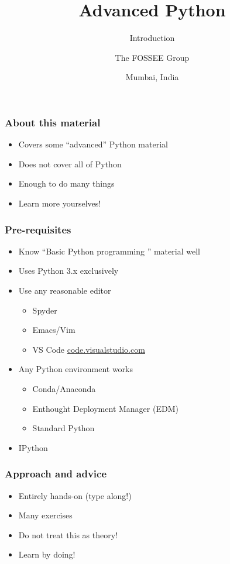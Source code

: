 \documentclass[14pt,compress,aspectratio=169]{beamer}
\title[Introduction]{Advanced Python}
\subtitle{Introduction}
\author[FOSSEE] {The FOSSEE Group}
\institute[IIT Bombay] {Department of Aerospace Engineering\\IIT Bombay}
\date[] {Mumbai, India}
\begin{document}
\begin{frame}
  \titlepage
\end{frame}

\begin{frame}
  \frametitle{About this material}
  \begin{itemize}
  \item Covers some ``advanced'' Python material
  \item Does not cover all of Python
  \item Enough to do many things
    \vspace*{0.5in}
  \item Learn more yourselves!
  \end{itemize}
\end{frame}

\begin{frame}
  \frametitle{Pre-requisites}
  \begin{itemize}
  \item Know ``Basic Python programming '' material well
  \item Uses Python 3.x exclusively
  \item Use any reasonable editor
    \begin{itemize}
    \item Spyder
    \item Emacs/Vim
    \item VS Code \url{code.visualstudio.com}
    \end{itemize}
  \item Any Python environment works
    \begin{itemize}
    \item Conda/Anaconda
    \item Enthought Deployment Manager (EDM)
    \item Standard Python
    \end{itemize}
  \item IPython
  \end{itemize}
\end{frame}

\begin{frame}
  \frametitle{Approach and advice}
  \begin{itemize}
  \item Entirely hands-on (type along!)
  \item Many exercises
  \item Do not treat this as theory!
  \item \alert{Learn by doing!}
  \end{itemize}
\end{frame}
\end{document}
